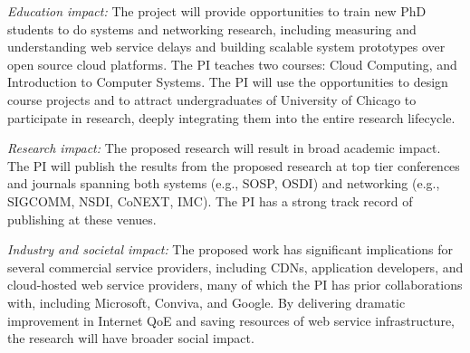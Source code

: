 \begin{packeditemize}


\item {\em Education impact:}
The project will provide opportunities to train new PhD students to do systems and networking research, including measuring and understanding web service delays and building scalable system prototypes over open source cloud platforms.
The PI teaches two courses: Cloud Computing, and Introduction to Computer Systems. The PI will use the opportunities to design course projects 
and to attract undergraduates of University of Chicago to participate in research, deeply integrating them into the entire research lifecycle.


\item {\em Research impact:}
The proposed research will result in broad academic impact.
The PI will publish the results from the proposed research at top tier conferences and journals spanning both systems (e.g., SOSP, OSDI) and networking (e.g., SIGCOMM, NSDI, CoNEXT, IMC).
The PI has a strong track record of publishing at these venues.


\item {\em Industry and societal impact:}
The proposed work has significant implications for several commercial service providers, including CDNs, application developers, and cloud-hosted web service providers, many of which the PI has prior collaborations with, including Microsoft, Conviva, and Google. 
By delivering dramatic improvement in Internet QoE and saving resources of web service infrastructure, the research will have broader social impact. 


\end{packeditemize}
